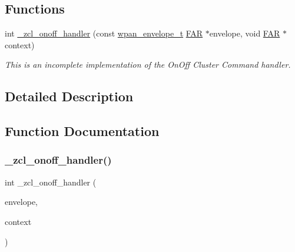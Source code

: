 \subsection*{Functions}
\begin{DoxyCompactItemize}
\item 
int \hyperlink{group__zcl__onoff_gae7dc87cd27559c9ae0499ac542ab6107}{\+\_\+zcl\+\_\+onoff\+\_\+handler} (const \hyperlink{structwpan__envelope__t}{wpan\+\_\+envelope\+\_\+t} \hyperlink{group__hal_gaef060b3456fdcc093a7210a762d5f2ed}{F\+AR} $\ast$envelope, void \hyperlink{group__hal_gaef060b3456fdcc093a7210a762d5f2ed}{F\+AR} $\ast$context)
\begin{DoxyCompactList}\small\item\em This is an incomplete implementation of the On\+Off Cluster Command handler. \end{DoxyCompactList}\end{DoxyCompactItemize}


\subsection{Detailed Description}


\subsection{Function Documentation}
\mbox{\label{group__zcl__onoff_gae7dc87cd27559c9ae0499ac542ab6107}} 
\subsubsection{\texorpdfstring{\+\_\+zcl\+\_\+onoff\+\_\+handler()}{\_zcl\_onoff\_handler()}}
{\footnotesize\ttfamily int \+\_\+zcl\+\_\+onoff\+\_\+handler (\begin{DoxyParamCaption}\item[{const \hyperlink{structwpan__envelope__t}{wpan\+\_\+envelope\+\_\+t} \hyperlink{group__hal_gaef060b3456fdcc093a7210a762d5f2ed}{F\+AR} $\ast$}]{envelope,  }\item[{void \hyperlink{group__hal_gaef060b3456fdcc093a7210a762d5f2ed}{F\+AR} $\ast$}]{context }\end{DoxyParamCaption})}



